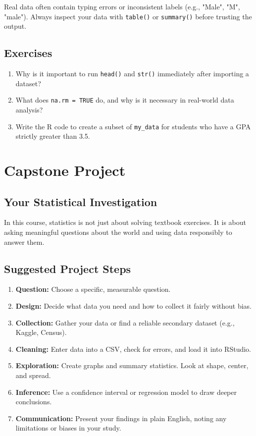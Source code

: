 \documentclass[11pt,openany]{book}
\begin{document}
\begin{mistakealert}
Real data often contain typing errors or inconsistent labels (e.g., "Male", "M", "male"). Always inspect your data with \texttt{table()} or \texttt{summary()} before trusting the output.
\end{mistakealert}

\section{Exercises}
\begin{enumerate}
    \item Why is it important to run \texttt{head()} and \texttt{str()} immediately after importing a dataset?
    \item What does \texttt{na.rm = TRUE} do, and why is it necessary in real-world data analysis?
    \item Write the R code to create a subset of \texttt{my\_data} for students who have a GPA strictly greater than 3.5.
\end{enumerate}

\chapter{Capstone Project}

\section{Your Statistical Investigation}
In this course, statistics is not just about solving textbook exercises. It is about asking meaningful questions about the world and using data responsibly to answer them.

\section{Suggested Project Steps}
\begin{enumerate}
    \item \textbf{Question:} Choose a specific, measurable question.
    \item \textbf{Design:} Decide what data you need and how to collect it fairly without bias.
    \item \textbf{Collection:} Gather your data or find a reliable secondary dataset (e.g., Kaggle, Census).
    \item \textbf{Cleaning:} Enter data into a CSV, check for errors, and load it into RStudio.
    \item \textbf{Exploration:} Create graphs and summary statistics. Look at shape, center, and spread.
    \item \textbf{Inference:} Use a confidence interval or regression model to draw deeper conclusions.
    \item \textbf{Communication:} Present your findings in plain English, noting any limitations or biases in your study.
\end{enumerate}
\end{document}
